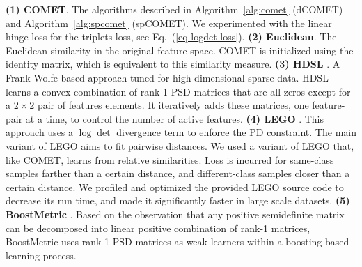 \documentclass[twoside,11pt]{article}
\renewcommand{\eqref}[1]{Eq.~(\ref{#1})}
\begin{document}
\textbf{(1) COMET}. The algorithms described in Algorithm~\ref{alg:comet} (dCOMET) and Algorithm~\ref{alg:spcomet} (spCOMET). We experimented with the linear hinge-loss for the triplets loss, see \eqref{eq-logdet-loss}. \textbf{(2) Euclidean}. The Euclidean similarity in the original feature space. COMET is initialized using the identity matrix, which is equivalent to this similarity measure.  \textbf{(3) HDSL} \citep{HDSL}. A Frank-Wolfe based approach tuned for high-dimensional sparse data. HDSL learns a convex combination of rank-1 PSD matrices that are all zeros except for a $2\times2$ pair of features elements. It iteratively adds these matrices, one feature-pair at a time, to control the number of active features. \textbf{(4) LEGO} \citep{lego}. This approach uses a $\log \det$ divergence term to enforce the PD constraint. The main variant of LEGO aims to fit pairwise distances. We used a variant of LEGO that, like COMET, learns from relative similarities. Loss is incurred for same-class samples farther than a certain distance, and different-class samples closer than a certain distance. We profiled and optimized the provided LEGO source code to decrease its run time, and made it significantly faster in large scale datasets. \textbf{(5) BoostMetric} \citep{boost}. Based on the observation that any positive semidefinite matrix can be decomposed into linear positive combination of rank-1 matrices, BoostMetric uses rank-1 PSD matrices as weak learners within a boosting based learning process.

\vspace{-6pt}
\end{document}
